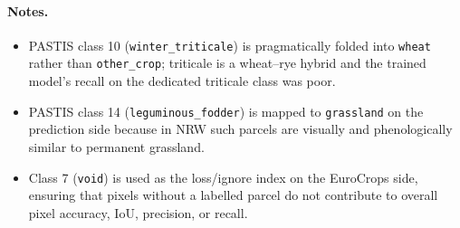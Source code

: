 \documentclass[11pt]{article}
\begin{document}
\paragraph{Notes.}
\begin{itemize}
  \item PASTIS class 10 (\texttt{winter\_triticale}) is pragmatically folded
        into \texttt{wheat} rather than \texttt{other\_crop}; triticale is a
        wheat--rye hybrid and the trained model's recall on the dedicated
        triticale class was poor.
  \item PASTIS class 14 (\texttt{leguminous\_fodder}) is mapped to
        \texttt{grassland} on the prediction side because in NRW such parcels
        are visually and phenologically similar to permanent grassland.
  \item Class 7 (\texttt{void}) is used as the loss/ignore index on the
        EuroCrops side, ensuring that pixels without a labelled parcel do not
        contribute to overall pixel accuracy, IoU, precision, or recall.
\end{itemize}
\end{document}
